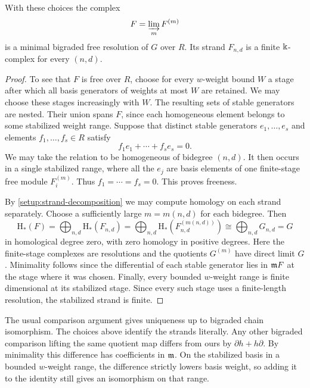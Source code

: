 \begin{corollary}
\label{setup:minimal}
With these choices the complex
\begin{equation}\label{setup:resolution-limit}
 F=\varinjlim_m F^{(m)}
\end{equation}
is a minimal bigraded free resolution of $G$ over $R$. Its strand
$F_{n,d}$ is a finite $\Bbbk$-complex for every $(n,d)$.
\end{corollary}
\begin{proof}
To see that $F$ is free over $R$, choose for every $w$-weight bound
$W$ a stage after which all basis generators of weights at most $W$
are retained. We may choose these stages increasingly with $W$.
The resulting sets of stable generators are nested. Their union spans
$F$, since each homogeneous element belongs to some stabilized weight
range. Suppose that distinct stable generators $e_1,\ldots,e_s$ and
elements $f_1,\ldots,f_s\in R$ satisfy
\[
 f_1e_1+\cdots+f_s e_s=0 .
\]
We may take the relation to be homogeneous of bidegree $(n,d)$.
It then occurs in a single stabilized range, where all the $e_j$ are
basis elements of one finite-stage free module $F_i^{(m)}$. Thus
$f_1=\cdots=f_s=0$. This proves freeness.

By \eqref{setup:strand-decomposition} we may compute homology on each
strand separately. Choose a sufficiently large $m=m(n,d)$ for each
bidegree. Then
\[
 \mathrm{H}_*(F)=\bigoplus_{n,d}\mathrm{H}_*(F_{n,d})
       =\bigoplus_{n,d}\mathrm{H}_*(F^{(m(n,d))}_{n,d})
       \cong\bigoplus_{n,d}G_{n,d}=G
\]
in homological degree zero, with zero homology in positive degrees.
Here the finite-stage complexes are resolutions and the quotients
$G^{(m)}$ have direct limit $G$. Minimality follows since the
differential of each stable generator lies in $\mathfrak m F$ at the stage
where it was chosen. Finally, every bounded $w$-weight range is
finite dimensional at its stabilized stage. Since every such stage
uses a finite-length resolution, the stabilized strand is finite.
\end{proof}

The usual comparison argument gives uniqueness up to bigraded chain
isomorphism. The choices above identify the strands literally. Any
other bigraded comparison lifting the same quotient map differs from
ours by $\partial h+h\partial$. By minimality this difference has
coefficients in $\mathfrak m$. On the stabilized basis in a bounded $w$-weight
range, the difference strictly lowers basis weight, so adding it
to the identity still gives an isomorphism on that range.


